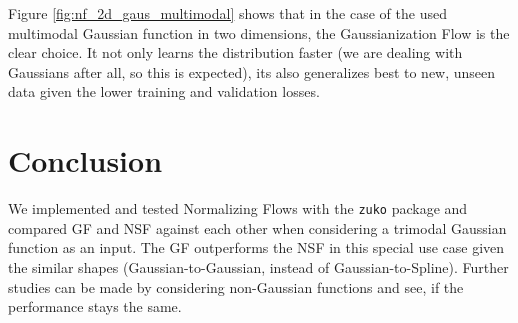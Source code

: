 \documentclass[
nofootinbib,
 amsmath,amssymb,
 aps,
]{revtex4-2}
\def\code#1{\texttt{#1}}
\begin{document}
Figure \ref{fig:nf_2d_gaus_multimodal} shows that in the case of the used multimodal Gaussian function in two dimensions, the Gaussianization Flow is the clear choice. It not only learns the distribution faster (we are dealing with Gaussians after all, so this is expected), its also generalizes best to new, unseen data given the lower training and validation losses. \\

\newpage

\section{Conclusion}
We implemented and tested Normalizing Flows with the \code{zuko} package and compared GF and NSF against each other when considering a trimodal Gaussian function as an input. The GF outperforms the NSF in this special use case given the similar shapes (Gaussian-to-Gaussian, instead of Gaussian-to-Spline). Further studies can be made by considering non-Gaussian functions and see, if the performance stays the same.

\end{document}
